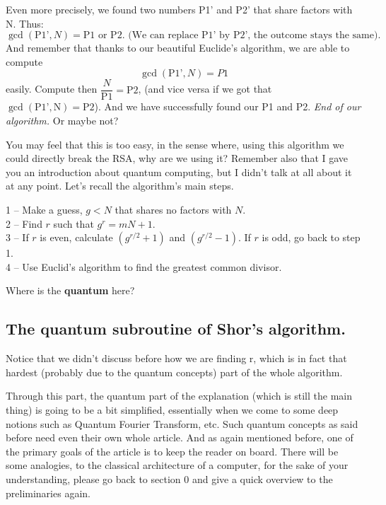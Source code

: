 Even more precisely, we found two numbers P1’ and P2’ that share factors with N. Thus:
$$
\gcd(\text{P1'}, N) = \text{P1 or P2. (We can replace P1’ by P2', the outcome stays the same).}
$$
And remember that thanks to our beautiful Euclide’s algorithm, we are able to compute $$\gcd(\text{P1'}, N) = P1$$easily. Compute then $\dfrac{N}{\text{P1}} = \text{P2}$, (and vice versa if we got that $\gcd(\text{P1'}, \text{N}) = \text{P2}$). And we have successfully found our P1 and P2.\nl
\textit{End of our algorithm.}\nl
Or maybe not?


You may feel that this is too easy, in the sense where, using this algorithm we could directly break the RSA, why are we using it? Remember also that I gave you an introduction about quantum computing, but I didn’t talk at all about it at any point.\nl
Let’s recall the algorithm’s main steps.

\begin{tcolorbox}
1 – Make a guess, $g < N$ that shares no factors with $N$.\\[0.5em]
2 – Find $r$ such that $g^r = mN + 1$.\\[0.5em]
3 – If $r$ is even, calculate $(g^{r/2} + 1)$ and $(g^{r/2} - 1)$. If $r$ is odd, go back to step 1.\\[0.5em]
4 – Use Euclid’s algorithm to find the greatest common divisor.
\end{tcolorbox}
Where is the \textbf{quantum} here?

\subsection{The quantum subroutine of Shor’s algorithm.}

Notice that we didn’t discuss before how we are finding r, which is in fact that hardest (probably due to the quantum concepts) part of the whole algorithm.
\begin{notebox}
    Through this part, the quantum part of the explanation (which is still the main thing) is going to be a bit simplified, essentially when we come to some deep notions such as Quantum Fourier Transform, etc. Such quantum concepts as said before need even their own whole article. And as again mentioned before, one of the primary goals of the article is to keep the reader on board.
There will be some analogies, to the classical architecture of a computer, for the sake of your understanding, please go back to section 0 and give a quick overview to the preliminaries again.

\end{notebox}

